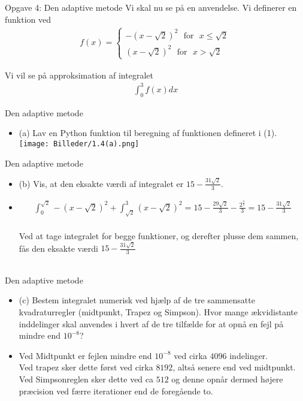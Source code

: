 \begin{frame}{Opgave 4: Den adaptive metode}
    Vi skal nu se på en anvendelse. Vi definerer en funktion ved
    \begin{align}
    f(x)=\left \{ \substack{-(x-\sqrt{2})^2 \text{  } \text{for} \text{  } x \leq \sqrt{2} \\ (x-\sqrt{2})^2\text{  } \text{for} \text{  } x > \sqrt{2}}
    \end{align}
    
    
    Vi vil se på approksimation af integralet 
    \begin{align}
    \int_{0}^{3}f(x)dx    
    \end{align}
\end{frame}


\begin{frame}{Den adaptive metode}
    \begin{itemize}
        \item (a) Lav en Python funktion til beregning af funktionen defineret i (1).
        \texttt{[image: Billeder/1.4(a).png]}
    \end{itemize}
\end{frame}


\begin{frame}{Den adaptive metode}
    \begin{itemize}
        \item (b) Vis, at den eksakte værdi af integralet er $15-\frac{31\sqrt{2}}{3}$.
        \item \begin{align*}
            \int^{\sqrt{2}}_0-(x-\sqrt{2})^2+\int^3_{\sqrt{2}}(x-\sqrt{2})^2=15-\frac{29\sqrt{2}}{3}-\frac{2^{\frac{3}{2}}}{3}=15-\frac{31\sqrt{2}}{3} 
            \end{align*} \\
            Ved at tage integralet for begge funktioner, og derefter plusse dem sammen, fås den eksakte værdi $15-\frac{31\sqrt{2}}{3}$\\\\
    \end{itemize}
\end{frame}


\begin{frame}{Den adaptive metode}
    \begin{itemize}
        \item (c) Bestem integralet numerisk ved hjælp af de tre sammensatte kvadraturregler (midtpunkt, Trapez og Simpson). 
        Hvor mange ækvidistante inddelinger skal anvendes i hvert af de tre tilfælde for at opnå en fejl på mindre end $10^{-8}$?
        \item Ved Midtpunkt er fejlen mindre end $10^{-8}$ ved cirka $4096$ indelinger.\\
        Ved trapez sker dette først ved cirka $8192$, altså senere end ved midtpunkt.\\ 
        Ved Simpsonreglen sker dette ved ca $512$ og denne opnår dermed højere præcision ved færre iterationer end de foregående to.
    \end{itemize} 
\end{frame}


